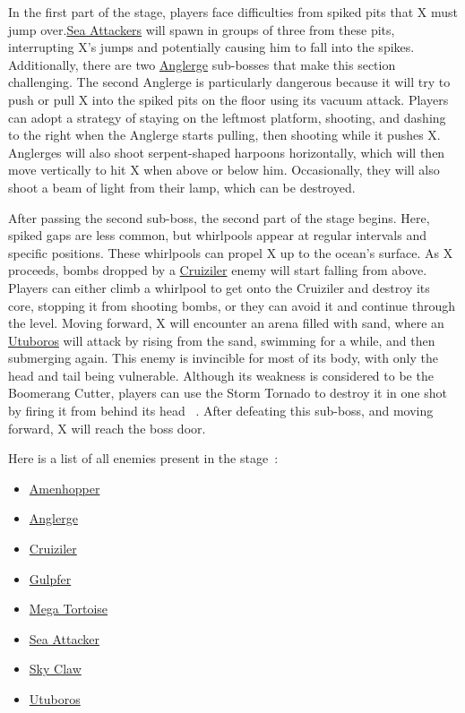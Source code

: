 In the first part of the stage, players face difficulties from spiked pits that X must jump over.\hyperlink{enem:Sea_Attacker}{Sea Attackers} will spawn in groups of three from these pits, interrupting X's jumps and potentially causing him to fall into the spikes. Additionally, there are two \hyperlink{miniboss:Anglerge}{Anglerge} sub-bosses that make this section challenging. The second Anglerge is particularly dangerous because it will try to push or pull X into the spiked pits on the floor using its vacuum attack. Players can adopt a strategy of staying on the leftmost platform, shooting, and dashing to the right when the Anglerge starts pulling, then shooting while it pushes X. Anglerges will also shoot serpent-shaped harpoons horizontally, which will then move vertically to hit X when above or below him. Occasionally, they will also shoot a beam of light from their lamp, which can be destroyed.

After passing the second sub-boss, the second part of the stage begins. Here, spiked gaps are less common, but whirlpools appear at regular intervals and specific positions. These whirlpools can propel X up to the ocean's surface. As X proceeds, bombs dropped by a \hyperlink{miniboss:Cruiziler}{Cruiziler} enemy will start falling from above. Players can either climb a whirlpool to get onto the Cruiziler and destroy its core, stopping it from shooting bombs, or they can avoid it and continue through the level. Moving forward, X will encounter an arena filled with sand, where an \hyperlink{miniboss:Utuboros}{Utuboros} will attack by rising from the sand, swimming for a while, and then submerging again. This enemy is invincible for most of its body, with only the head and tail being vulnerable. Although its weakness is considered to be the Boomerang Cutter, players can use the Storm Tornado to destroy it in one shot by firing it from behind its head ~\cite{wiki:Utuboros}. After defeating this sub-boss, and moving forward, X will reach the boss door.

Here is a list of all enemies present in the stage~\cite{wiki:Ocean}:
\begin{itemize}
	\item \hyperlink{enem:Amenhopper}{Amenhopper}
	\item \hyperlink{miniboss:Anglerge}{Anglerge}
	\item \hyperlink{miniboss:Cruiziler}{Cruiziler}
	\item \hyperlink{enem:Gulpfer}{Gulpfer }
	\item \hyperlink{enem:Mega_Tortoise}{Mega Tortoise }
	\item \hyperlink{enem:Sea_Attacker}{Sea Attacker}
	\item \hyperlink{enem:Sky_Claw}{Sky Claw }
	\item \hyperlink{miniboss:Utuboros}{Utuboros}
\end{itemize}

